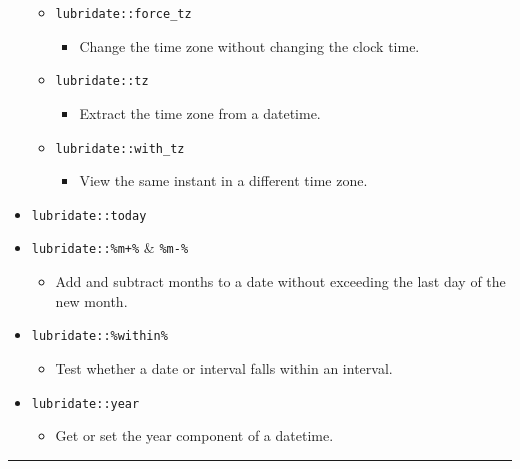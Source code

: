\documentclass[
]{book}
\providecommand{\tightlist}{%
  \setlength{\itemsep}{0pt}\setlength{\parskip}{0pt}}
\begin{document}
\begin{itemize}
  \begin{itemize}
  \tightlist
  \item
    \texttt{lubridate::force\_tz}

    \begin{itemize}
    \tightlist
    \item
      Change the time zone without changing the clock time.
    \end{itemize}
  \item
    \texttt{lubridate::tz}

    \begin{itemize}
    \tightlist
    \item
      Extract the time zone from a datetime.
    \end{itemize}
  \item
    \texttt{lubridate::with\_tz}

    \begin{itemize}
    \tightlist
    \item
      View the same instant in a different time zone.
    \end{itemize}
  \end{itemize}
\item
  \texttt{lubridate::today}
\item
  \texttt{lubridate::\%m+\%} \& \texttt{\%m-\%}

  \begin{itemize}
  \tightlist
  \item
    Add and subtract months to a date without exceeding the last day of the new month.
  \end{itemize}
\item
  \texttt{lubridate::\%within\%}

  \begin{itemize}
  \tightlist
  \item
    Test whether a date or interval falls within an interval.
  \end{itemize}
\item
  \texttt{lubridate::year}

  \begin{itemize}
  \tightlist
  \item
    Get or set the year component of a datetime.
  \end{itemize}
\end{itemize}

\begin{center}\rule{0.5\linewidth}{0.5pt}\end{center}
\end{document}
